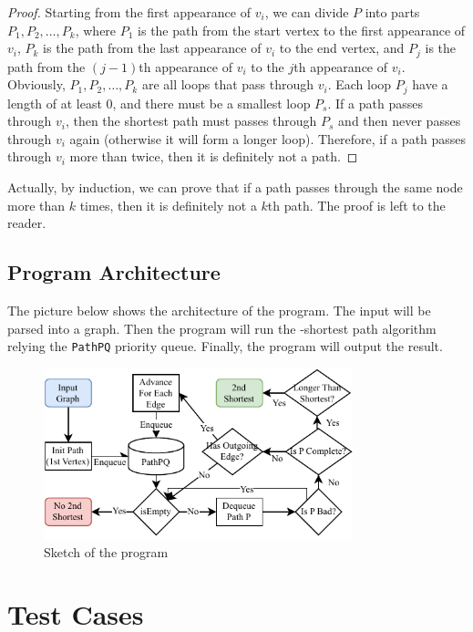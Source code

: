\documentclass[a4paper,oneside]{book}
\begin{document}
\begin{proof}
    Starting from the first appearance of $v_i$, we can divide $P$ into parts $P_1, P_2, \dots, P_k$, where $P_1$ is the path from the start vertex to the first appearance of $v_i$, $P_k$ is the path from the last appearance of $v_i$ to the end vertex, and $P_j$ is the path from the $(j-1)$th appearance of $v_i$ to the $j$th appearance of $v_i$. Obviously, $P_1, P_2, \dots, P_k$ are all loops that pass through $v_i$. Each loop $P_j$ have a length of at least 0, and there must be a smallest loop $P_s$. If a path passes through $v_i$, then the  shortest path must passes through $P_s$ and then never passes through $v_i$ again (otherwise it will form a longer loop). Therefore, if a path passes through $v_i$ more than twice, then it is definitely not a  path.
\end{proof}

Actually, by induction, we can prove that if a path passes through the same node more than $k$ times, then it is definitely not a $k$th path. The proof is left to the reader.

\section{Program Architecture}

The picture below shows the architecture of the program. The input will be parsed into a graph. Then the program will run the -shortest path algorithm relying the \verb|PathPQ| priority queue. Finally, the program will output the result.

\begin{figure}[!ht]
    \centering
    \caption{Sketch of the program}
    \includegraphics[width=0.8\textwidth]{src/program.drawio.pdf}
\end{figure}

\chapter{Test Cases}
\end{document}
